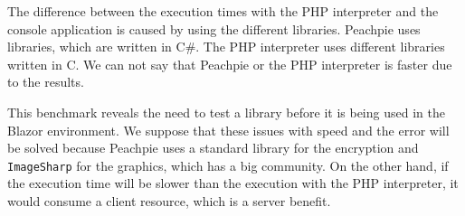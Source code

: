 The difference between the execution times with the PHP interpreter and the console application is caused by using the different libraries.
Peachpie uses libraries, which are written in C\#.
The PHP interpreter uses different libraries written in C.
We can not say that Peachpie or the PHP interpreter is faster due to the results.
\par
This benchmark reveals the need to test a library before it is being used in the Blazor environment.
We suppose that these issues with speed and the error will be solved because Peachpie uses a standard library for the encryption and \texttt{ImageSharp} for the graphics, which has a big community.
On the other hand, if the execution time will be slower than the execution with the PHP interpreter, it would consume a client resource, which is a server benefit.